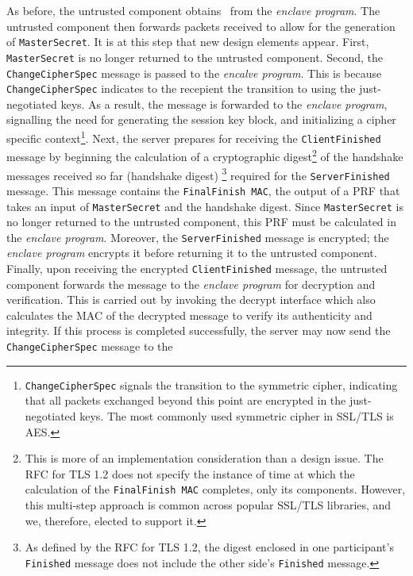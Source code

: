 \documentclass[../../main.tex]{subfiles}
\begin{document}
As before, the untrusted component obtains \srandom~from the
\textit{enclave program}. The untrusted component then forwards
packets received to allow for the generation of
\texttt{MasterSecret}. It is at this step that new design elements
appear. First, \texttt{MasterSecret} is no longer returned to the
untrusted component. Second, the \texttt{Change\-CipherSpec} message
is passed to the \textit{encalve program}. This is because
\texttt{ChangeCipherSpec} indicates to the recepient the transition to
using the just-negotiated keys. As a result, the message is forwarded
to the \textit{enclave program}, signalling the need for generating
the session key block, and initializing a cipher specific
context\footnote{\texttt{ChangeCipherSpec} signals the transition to
  the symmetric cipher, indicating that all packets exchanged beyond
  this point are encrypted in the just-negotiated keys. The most
  commonly used symmetric cipher in SSL/TLS is AES.}. Next, the server
prepares for receiving the \texttt{ClientFinished} message by
beginning the calculation of a cryptographic digest\footnote{This is
  more of an implementation consideration than a design issue. The RFC
  for TLS 1.2 does not specify the instance of time at which the
  calculation of the \texttt{FinalFinish MAC} completes, only its
  components. However, this multi-step approach is common across
  popular SSL/TLS libraries, and we, therefore, elected to support
  it.} of the handshake messages received so far (handshake digest)
\footnote{As defined by the RFC for TLS 1.2, the digest enclosed in
  one participant's \texttt{Finished} message does not include the
  other side's \texttt{Finished} message.} required for the
\texttt{ServerFinished} message. This message contains the
\texttt{FinalFinish MAC}, the output of a PRF that takes an input of
\texttt{MasterSecret} and the handshake digest. Since
\texttt{MasterSecret} is no longer returned to the untrusted
component, this PRF must be calculated in the \textit{enclave
  program}. Moreover, the \texttt{ServerFinished} message is
encrypted; the \textit{enclave program} encrypts it before returning
it to the untrusted component. Finally, upon receiving the encrypted
\texttt{ClientFinished} message, the untrusted component forwards the
message to the \textit{enclave program} for decryption and
verification. This is carried out by invoking the decrypt interface
which also calculates the MAC of the decrypted message to verify its
authenticity and integrity. If this process is completed successfully,
the server may now send the \texttt{ChangeCipherSpec} message to the
\end{document}
